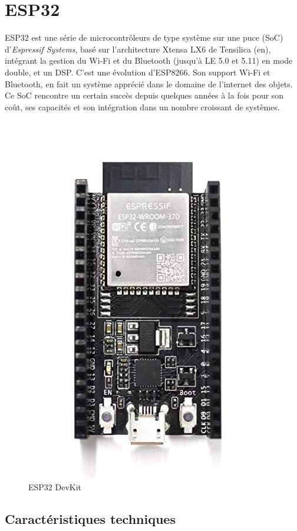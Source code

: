 \section{ESP32}
ESP32 est une série de microcontrôleurs de type système sur une puce (SoC)
d’\emph{Espressif Systems}, basé sur l’architecture Xtensa LX6 de Tensilica
(en), intégrant la gestion du Wi-Fi et du Bluetooth (jusqu’à LE 5.0 et 5.11) en
mode double, et un DSP. C’est une évolution d’ESP8266. Son support Wi-Fi et
Bluetooth, en fait un système apprécié dans le domaine de l’internet des objets.
Ce SoC rencontre un certain succès depuis quelques années à la fois pour son
coût, ses capacités et son intégration dans un nombre croissant de
systèmes.\cite{32}

\begin{figure}[h!]
    \centering
    \includegraphics[scale=0.30]{images/esp32.jpg}
    \caption{ESP32 DevKit}
    \label{fig49}
\end{figure}

\subsection{Caractéristiques techniques}\cite{33}

